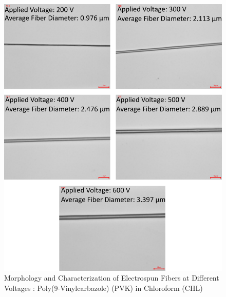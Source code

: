 \begin{figure}[!th]
\centering
\includegraphics[scale=0.55]{./Figures/microscopy_pvk_chl.png}
\decoRule
\caption[Morphology and Characterization of Electrospun Fibers at Different Voltages : Poly(9-Vinylcarbazole) (PVK) in Chloroform (CHL) ]{Morphology and Characterization of Electrospun Fibers at Different Voltages : Poly(9-Vinylcarbazole) (PVK) in Chloroform (CHL) }
\label{fig:microscopy_pvk_chl}
\end{figure}

